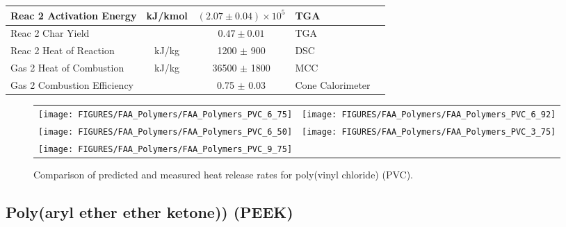 \begin{table}[h!]
\begin{center}
\begin{tabular}{|l|c|c|l|l|}
Reac 2 Activation Energy    & kJ/kmol       & $(2.07 \pm 0.04) \times 10^{5}$   & TGA                       &  \cite{Stoliarov:CF2010}                  \\ \hline
Reac 2 Char Yield           &               & $0.47 \pm 0.01$                   & TGA                       &  \cite{Stoliarov:CF2010}                  \\ \hline
Reac 2 Heat of Reaction     & kJ/kg         & 1200 $\pm$ 900                    & DSC                       &  \cite{Stoliarov:PDS2008}                 \\ \hline
Gas 2 Heat of Combustion    & kJ/kg         & 36500 $\pm$ 1800                  & MCC                       &  \cite{Stoliarov:CF2010}                  \\ \hline
Gas 2 Combustion Efficiency &               & 0.75 $\pm$ 0.03                   & Cone Calorimeter          &  \cite{Stoliarov:CF2010}                  \\ \hline
\end{tabular}
\end{center}
\label{Properties_PVC}
\end{table}

\begin{figure}[p]
\begin{tabular*}{\textwidth}{l@{\extracolsep{\fill}}r}
\texttt{[image: FIGURES/FAA\_Polymers/FAA\_Polymers\_PVC\_6\_75]} &
\texttt{[image: FIGURES/FAA\_Polymers/FAA\_Polymers\_PVC\_6\_92]} \\
\texttt{[image: FIGURES/FAA\_Polymers/FAA\_Polymers\_PVC\_6\_50]} &
\texttt{[image: FIGURES/FAA\_Polymers/FAA\_Polymers\_PVC\_3\_75]} \\
\texttt{[image: FIGURES/FAA\_Polymers/FAA\_Polymers\_PVC\_9\_75]} &
\end{tabular*}
\caption[Heat release rate of poly(vinyl chloride) (PVC).]{Comparison of predicted and measured heat release rates for poly(vinyl chloride) (PVC).}
\label{HRR_PVC}
\end{figure}

\clearpage



\subsection{Poly(aryl ether ether ketone)) (PEEK)}

